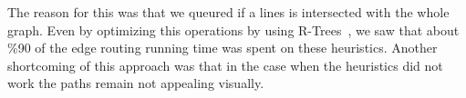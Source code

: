 \documentclass{gd-llncs}
\newcommand{\comm}[1]{}
\begin{document}
\label{fig:shortcut}  

The reason for this was that we queured if a lines is intersected with the whole graph. Even by optimizing this operations by using R-Trees~\cite{guttman1984r}, we saw that about \%90 of the edge routing running time was spent on these heuristics. Another shortcoming of this approach was that in the case when the heuristics did not work the paths remain not appealing visually. 


\comm{
\section{Further Examples}
}
 

\end{document}
